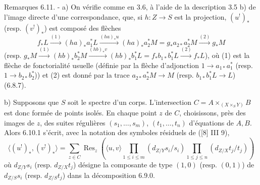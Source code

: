 \begin{statement}{Remarques 6.11. -}
a) On vérifie comme en 3.6, à l'aide de la description 3.5 b) de l'image directe d'une correspondance, que, si $h:Z\to S$ est la projection, $(u^!)_*$ (resp. $(v^!)_*$) est composé des flèches
\[
f_*L\xrightarrow{(1)}(ha)_*a_1^*L\xrightarrow{(ha)_*u}(ha)_*a_2^*M=g_*a_{2*}a_2^*M\xrightarrow{(2)}g_*M
\]
(resp. $g_*M\xrightarrow{(1)}(hb)_*b_2^*M\xrightarrow{(hb)_*v}(hb)_*b_1^*L=f_*b_{1*}b_1^*L\xrightarrow{(2)}f_*L$),
où (1) est la flèche de fonctorialité usuelle (définie par la flèche d'adjonction $1\to a_{1*}a_1^*$ (resp. $1\to b_{2*}b_2^*$)) et (2) est donné par la trace $a_{2*}a_2^*M\to M$ (resp. $b_{1*}b_1^*L\to L$) (6.8.7).

b) Supposons que $S$ soit le spectre d'un corps. L'intersection $C=A\times_{(X\times_S Y)}B$ est donc formée de points isolés. En chaque point $z$ de $C$, choisissons, près des images de $z$, des suites régulières $(s_1,\ldots,s_m)$, $(t_1,\ldots,t_n)$ d'équations de $A,B$. Alors 6.10.1 s'écrit, avec la notation des symboles résiduels de ([8] III 9),
\begin{equation}
\tag{6.11.1}
\langle (u^!)_*,(v^!)_*\rangle=
\sum_{z\in C}\operatorname{Res}_z\left(\langle u,v\rangle
\prod_{1\le i\le m}(d_{Z/Y}s_i/s_i)
\prod_{1\le j\le n}(d_{Z/X}t_j/t_j)\right)
\end{equation}
où $d_{Z/Y}s_i$ (resp. $d_{Z/X}t_j$) désigne la composante de type $(1,0)$ (resp. $(0,1)$) de $d_{Z/S}s_i$ (resp. $d_{Z/S}t_j$) dans la décomposition 6.9.0.
\end{statement}

